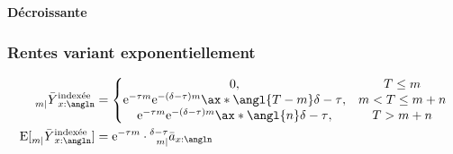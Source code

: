 \documentclass[10pt, french]{article}
\begin{document}
\begin{multicols*}{3}
\textbf{Décroissante}
%
%
%
%
%
%
%
%
%
%
%
%
%


\subsubsection*{\textcolor{amber(sae/ece)}{Rentes variant exponentiellement}}

\begin{align*}
	\prescript{}{m |}{\bar{Y}}^{\text{indexée}}_{x:\angln}
	&=	
	\left\{
	\begin{matrix}
		0,	&	T \le m \\
		\e{-\tau m} \e{-(\delta - \tau)m} \ax*{\angl{T - m}\delta - \tau},	&	m < T \le m + n \\
		\e{-\tau m} \e{-(\delta - \tau)m} \ax*{\angl{n}\delta - \tau},	&	T > m + n
	\end{matrix}
	\right.	\\
	\text{E}[\prescript{}{m |}{\bar{Y}}^{\text{indexée}}_{x:\angln}]
	&=	\e{-\tau m} \cdot \prescript{\delta - \tau}{m|}{\bar{a}}_{x:\angln}
\end{align*}


\end{multicols*}
\end{document}
